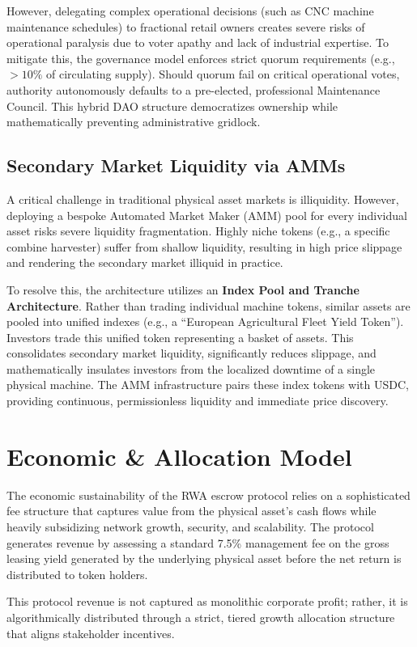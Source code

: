 \documentclass[12pt, a4paper]{article}
\begin{document}
However, delegating complex operational decisions (such as CNC machine maintenance schedules) to fractional retail owners creates severe risks of operational paralysis due to voter apathy and lack of industrial expertise. To mitigate this, the governance model enforces strict quorum requirements (e.g., $>10\%$ of circulating supply). Should quorum fail on critical operational votes, authority autonomously defaults to a pre-elected, professional Maintenance Council. This hybrid DAO structure democratizes ownership while mathematically preventing administrative gridlock.

\subsection{Secondary Market Liquidity via AMMs}
A critical challenge in traditional physical asset markets is illiquidity. However, deploying a bespoke Automated Market Maker (AMM) pool for every individual asset risks severe liquidity fragmentation. Highly niche tokens (e.g., a specific combine harvester) suffer from shallow liquidity, resulting in high price slippage and rendering the secondary market illiquid in practice.

To resolve this, the architecture utilizes an \textbf{Index Pool and Tranche Architecture}. Rather than trading individual machine tokens, similar assets are pooled into unified indexes (e.g., a ``European Agricultural Fleet Yield Token''). Investors trade this unified token representing a basket of assets. This consolidates secondary market liquidity, significantly reduces slippage, and mathematically insulates investors from the localized downtime of a single physical machine. The AMM infrastructure pairs these index tokens with USDC, providing continuous, permissionless liquidity and immediate price discovery.

\section{Economic \& Allocation Model}
The economic sustainability of the RWA escrow protocol relies on a sophisticated fee structure that captures value from the physical asset's cash flows while heavily subsidizing network growth, security, and scalability. The protocol generates revenue by assessing a standard 7.5\% management fee on the gross leasing yield generated by the underlying physical asset before the net return is distributed to token holders.

This protocol revenue is not captured as monolithic corporate profit; rather, it is algorithmically distributed through a strict, tiered growth allocation structure that aligns stakeholder incentives.
\end{document}
